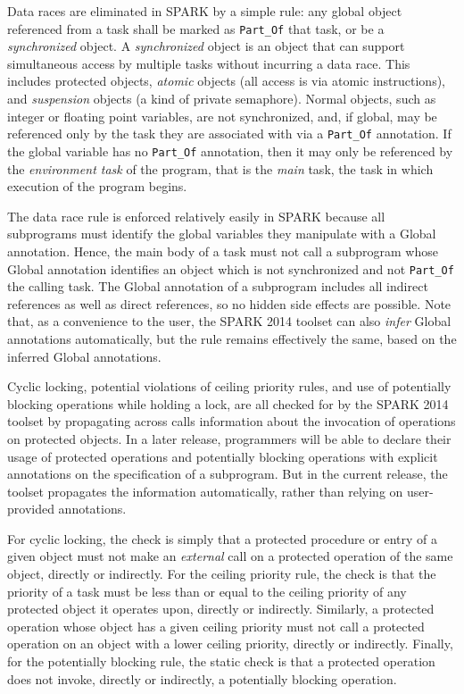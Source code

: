 \documentclass[conference,compsoc]{IEEEtran}
\begin{document}
Data races are eliminated in SPARK by a simple rule: any global object
referenced from a task shall be marked as \verb|Part_Of| that task, or be a
\emph{synchronized} object. A \emph{synchronized} object is an object that
can support simultaneous access by multiple tasks without incurring a data
race. This includes protected objects, \emph{atomic} objects (all access is
via atomic instructions), and \emph{suspension} objects (a kind of private
semaphore). Normal objects, such as integer or floating point variables,
are not synchronized, and, if global, may be referenced only by the task
they are associated with via a \verb|Part_Of| annotation. If the global
variable has no \verb|Part_Of| annotation, then it may only be referenced
by the \emph{environment task} of the program, that is the \emph{main}
task, the task in which execution of the program begins.

The data race rule is enforced relatively easily in SPARK because all
subprograms must identify the global variables they manipulate with a
Global annotation. Hence, the main body of a task must not call a
subprogram whose Global annotation identifies an object which is not
synchronized and not \verb|Part_Of| the calling task. The Global annotation
of a subprogram includes all indirect references as well as direct
references, so no hidden side effects are possible. Note that, as a
convenience to the user, the SPARK 2014 toolset can also \emph{infer}
Global annotations automatically, but the rule remains effectively the
same, based on the inferred Global annotations.

Cyclic locking, potential violations of ceiling priority rules, and use of
potentially blocking operations while holding a lock, are all checked for
by the SPARK 2014 toolset by propagating across calls information about the
invocation of operations on protected objects. In a later release,
programmers will be able to declare their usage of protected operations and
potentially blocking operations with explicit annotations on the
specification of a subprogram. But in the current release, the toolset
propagates the information automatically, rather than relying on
user-provided annotations.

For cyclic locking, the check is simply that a protected procedure or entry
of a given object must not make an \emph{external} call on a protected
operation of the same object, directly or indirectly. For the ceiling
priority rule, the check is that the priority of a task must be less than
or equal to the ceiling priority of any protected object it operates upon,
directly or indirectly. Similarly, a protected operation whose object has a
given ceiling priority must not call a protected operation on an object
with a lower ceiling priority, directly or indirectly. Finally, for the
potentially blocking rule, the static check is that a protected operation
does not invoke, directly or indirectly, a potentially blocking operation.
\end{document}
